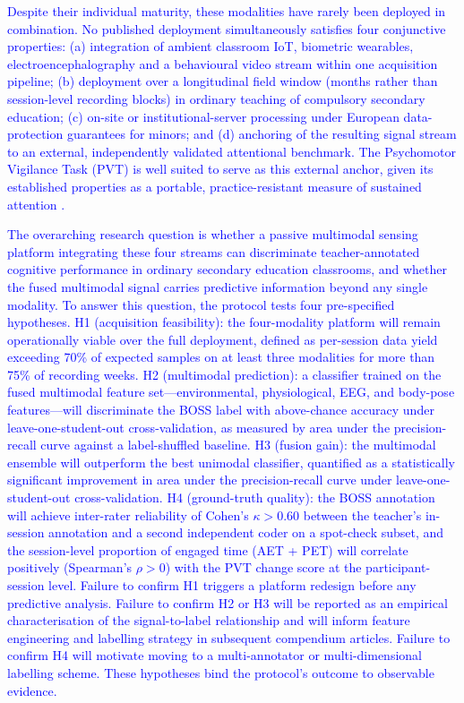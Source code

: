\textcolor{blue}{Despite their individual maturity, these modalities have rarely been deployed in combination. No published deployment simultaneously satisfies four conjunctive properties: (a) integration of ambient classroom IoT, biometric wearables, electroencephalography and a behavioural video stream within one acquisition pipeline; (b) deployment over a longitudinal field window (months rather than session-level recording blocks) in ordinary teaching of compulsory secondary education; (c) on-site or institutional-server processing under European data-protection guarantees for minors; and (d) anchoring of the resulting signal stream to an external, independently validated attentional benchmark. The Psychomotor Vigilance Task (PVT) is well suited to serve as this external anchor, given its established properties as a portable, practice-resistant measure of sustained attention \parencite{Dinges1985_pvt,Basner2011_pvt,Loh2004_pvt_short,Basner2018_pvt_practice}.}

\textcolor{blue}{The overarching research question is whether a passive multimodal sensing platform integrating these four streams can discriminate teacher-annotated cognitive performance in ordinary secondary education classrooms, and whether the fused multimodal signal carries predictive information beyond any single modality. To answer this question, the protocol tests four pre-specified hypotheses. H1 (acquisition feasibility): the four-modality platform will remain operationally viable over the full deployment, defined as per-session data yield exceeding 70\% of expected samples on at least three modalities for more than 75\% of recording weeks. H2 (multimodal prediction): a classifier trained on the fused multimodal feature set---environmental, physiological, EEG, and body-pose features---will discriminate the BOSS label with above-chance accuracy under leave-one-student-out cross-validation, as measured by area under the precision-recall curve against a label-shuffled baseline. H3 (fusion gain): the multimodal ensemble will outperform the best unimodal classifier, quantified as a statistically significant improvement in area under the precision-recall curve under leave-one-student-out cross-validation. H4 (ground-truth quality): the BOSS annotation will achieve inter-rater reliability of Cohen's $\kappa > 0.60$ between the teacher's in-session annotation and a second independent coder on a spot-check subset, and the session-level proportion of engaged time (AET + PET) will correlate positively (Spearman's $\rho > 0$) with the PVT change score at the participant-session level. Failure to confirm H1 triggers a platform redesign before any predictive analysis. Failure to confirm H2 or H3 will be reported as an empirical characterisation of the signal-to-label relationship and will inform feature engineering and labelling strategy in subsequent compendium articles. Failure to confirm H4 will motivate moving to a multi-annotator or multi-dimensional labelling scheme. These hypotheses bind the protocol's outcome to observable evidence.}

